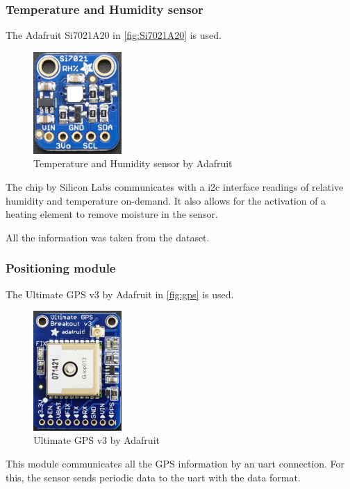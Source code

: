 \subsubsection{Temperature and Humidity sensor}
The Adafruit Si7021A20\cite{Support_Documents_TechnicalDocs_Si7021A20} in \autoref{fig:Si7021A20} is used.
\begin{figure}[H]
    \centering
    \includegraphics[width=0.3\textwidth]{images/3/th.png}
    \caption{Temperature and Humidity sensor by Adafruit}
    \label{fig:Si7021A20}
\end{figure}
The chip by Silicon Labs communicates with a \acrshort{i2c} interface readings of relative humidity and temperature on-demand. It also allows for the activation of a heating element to remove moisture in the sensor.

All the information was taken from the dataset\cite{Support_Documents_TechnicalDocs_Si7021A20}.
\clearpage
\subsubsection{Positioning module}
The Ultimate GPS v3 by Adafruit\cite{gpsDownloadsAda} in \autoref{fig:gps} is used.
\begin{figure}[H]
    \centering
    \includegraphics[width=0.3\textwidth]{images/3/gps.png}
    \caption{Ultimate GPS v3 by Adafruit}
    \label{fig:gps}
\end{figure}

This module communicates all the GPS information by an \acrshort{uart} connection. For this, the sensor sends periodic data to the \acrshort{uart} with the  data format.

